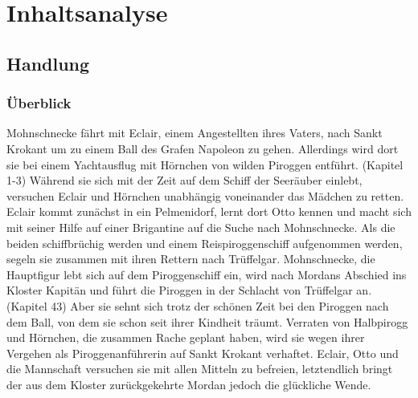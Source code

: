 \section{Inhaltsanalyse}

\subsection{Handlung}

\subsubsection{Überblick}
Mohnschnecke fährt mit Eclair, einem Angestellten ihres Vaters, nach Sankt Krokant um zu einem Ball des Grafen Napoleon zu gehen. Allerdings wird dort sie bei einem Yachtausflug mit Hörnchen von wilden Piroggen entführt. (Kapitel 1-3) Während sie sich mit der Zeit auf dem Schiff der Seeräuber einlebt, versuchen Eclair und Hörnchen unabhängig voneinander das Mädchen zu retten.  Eclair kommt zunächst in ein Pelmenidorf, lernt dort Otto kennen und macht sich mit seiner Hilfe auf einer  Brigantine auf die Suche nach Mohnschnecke. Als die beiden schiffbrüchig werden und einem Reispiroggenschiff aufgenommen werden, segeln sie zusammen mit ihren Rettern nach Trüffelgar. Mohnschnecke, die Hauptfigur lebt sich auf dem Piroggenschiff ein, wird nach Mordans Abschied ins Kloster Kapitän und führt die Piroggen in der Schlacht von Trüffelgar an. (Kapitel 43) Aber sie sehnt sich trotz der schönen Zeit bei den Piroggen nach dem Ball, von dem sie schon seit ihrer Kindheit träumt. Verraten von Halbpirogg und Hörnchen, die zusammen Rache geplant haben, wird sie wegen ihrer Vergehen als Piroggenanführerin auf Sankt Krokant verhaftet. Eclair, Otto und die Mannschaft versuchen sie mit allen Mitteln zu befreien, letztendlich bringt der aus dem Kloster zurückgekehrte Mordan jedoch die glückliche Wende.

